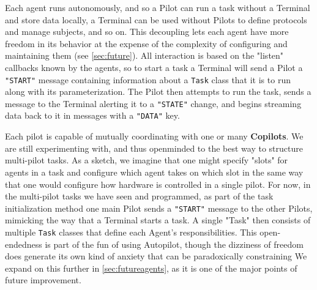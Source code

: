 Each agent runs autonomously, and so a Pilot can run a task without a Terminal and store data locally, a Terminal can be used without Pilots to define protocols and manage subjects, and so on. This decoupling lets each agent have more freedom in its behavior at the expense of the complexity of configuring and maintaining them (see \ref{sec:future}). All interaction is based on the "listen" callbacks known by the agents, so to start a task a Terminal will send a Pilot a \texttt{"START"} message containing information about a \texttt{Task} class that it is to run along with its parameterization. The Pilot then attempts to run the task, sends a message to the Terminal alerting it to a \texttt{"STATE"} change, and begins streaming data back to it in messages with a \texttt{"DATA"} key.

Each pilot is capable of mutually coordinating with one or many \textbf{Copilots}. We are still experimenting with, and thus openminded to the best way to structure multi-pilot tasks. As a sketch, we imagine that one might specify "slots" for agents in a task and configure which agent takes on which slot in the same way that one would configure how hardware is controlled in a single pilot. For now, in the multi-pilot tasks we have seen and programmed, as part of the task initialization method one main Pilot sends a \texttt{"START"} message to the other Pilots, mimicking the way that a Terminal starts a task. A single "Task" then consists of multiple \texttt{Task} classes that define each Agent's responsibilities. This open-endedness is part of the fun of using Autopilot, though the dizziness of freedom does generate its own kind of anxiety that can be paradoxically constraining We expand on this further in \ref{sec:futureagents}, as it is one of the major points of future improvement. 


